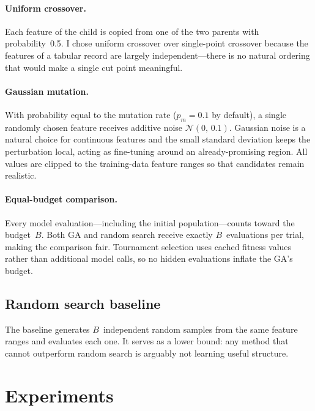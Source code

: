 \documentclass[10pt]{article}
\begin{document}
\paragraph{Uniform crossover.}
Each feature of the child is copied from one of the two parents with probability~0.5.
I chose uniform crossover over single-point crossover because the features of a
tabular record are largely independent---there is no natural ordering that would make
a single cut point meaningful.

\paragraph{Gaussian mutation.}
With probability equal to the mutation rate ($p_m = 0.1$ by default), a single randomly
chosen feature receives additive noise $\mathcal{N}(0,\,0.1)$.  Gaussian noise is a
natural choice for continuous features and the small standard deviation keeps the
perturbation local, acting as fine-tuning around an already-promising region.  All values
are clipped to the training-data feature ranges so that candidates remain realistic.

\paragraph{Equal-budget comparison.}
Every model evaluation---including the initial population---counts toward the budget~$B$.
Both GA and random search receive exactly $B$~evaluations per trial, making the
comparison fair.  Tournament selection uses cached fitness values rather than additional
model calls, so no hidden evaluations inflate the GA's budget.

\subsection{Random search baseline}
The baseline generates $B$~independent random samples from the same feature ranges and
evaluates each one.  It serves as a lower bound: any method that cannot outperform random
search is arguably not learning useful structure.

\section{Experiments}
\end{document}

